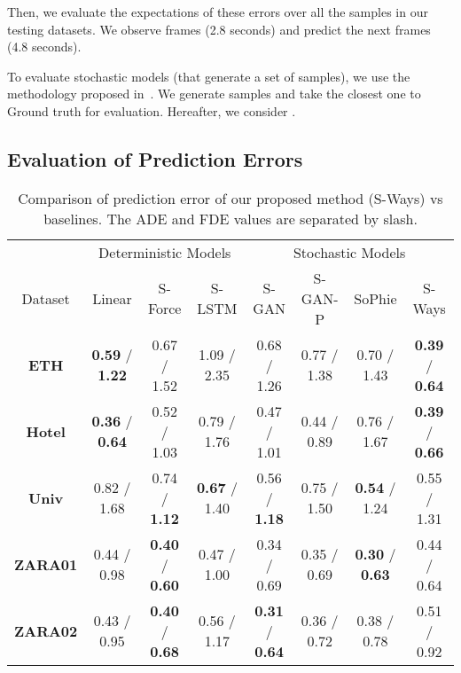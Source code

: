 \documentclass[10pt,twocolumn,letterpaper]{article}
\begin{document}
Then, we evaluate the expectations of these errors over all the samples in our testing datasets. We observe  frames (2.8 seconds) and predict the next  frames (4.8 seconds).

To evaluate stochastic models (that generate a set of samples), we use the methodology proposed in~\cite{SocialGAN2018}. We generate  samples and take the closest one to Ground truth for evaluation. Hereafter, we consider .

\subsection{Evaluation of Prediction Errors}

\begin{table*}[t]
	\begin{center}
	\begin{tabular}{c||c|c|c||c|c|c|||c}
		
\multicolumn{1}{c}{~} &
		\multicolumn{3}{c}{Deterministic Models} &
		\multicolumn{4}{c}{Stochastic Models} \\
		Dataset & Linear & S-Force & S-LSTM & S-GAN & S-GAN-P & SoPhie & S-Ways \\
		\hline \hline
		
		\textbf{ETH}
                & \textbf{0.59} / \textbf{1.22} & 0.67 / 1.52 & 1.09 / 2.35 & 0.68 / 1.26 & 0.77 / 1.38 & 0.70 / 1.43 & \textbf{0.39} / \textbf{0.64} \\


\textbf{Hotel}
                & \textbf{0.36} / \textbf{0.64} & 0.52 / 1.03 & 0.79 / 1.76 & 0.47 / 1.01 & 0.44 / 0.89 & 0.76 / 1.67  & \textbf{0.39} / \textbf{0.66} \\


\textbf{Univ}
                & 0.82 / 1.68 & 0.74 / \textbf{1.12} & \textbf{0.67} / 1.40 & 0.56 / \textbf{1.18} & 0.75 / 1.50 & \textbf{0.54} / 1.24 & 0.55 / 1.31 \\


\textbf{ZARA01}
                & 0.44 / 0.98 & \textbf{0.40} / \textbf{0.60} & 0.47 / 1.00 & 0.34 / 0.69 & 0.35 / 0.69 & \textbf{0.30} / \textbf{0.63} & 0.44 / 0.64 \\


\textbf{ZARA02}
                & 0.43 / 0.95 & \textbf{0.40} / \textbf{0.68} & 0.56 / 1.17 & \textbf{0.31} / \textbf{0.64} & 0.36 / 0.72 & 0.38 / 0.78 & 0.51 / 0.92  \\
\end{tabular}
	\end{center}
	\caption{Comparison of prediction error of our proposed method (S-Ways) vs baselines. The ADE and FDE values are separated by slash.}
\label{table:1}
\end{table*}
\end{document}
